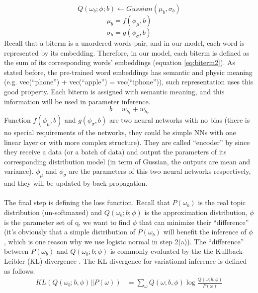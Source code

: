 \begin{equation}
    Q(\omega_b;\phi;b) \leftarrow Gussian(\mu_b,\sigma_b)
\label{eq:var1}
\end{equation}
\begin{equation}
    \mu_b = f(\phi_{\mu}, b)
\label{eq:var2}
\end{equation}
\begin{equation}
    \sigma_b = g(\phi_{\sigma}, b)
\label{eq:var3}
\end{equation}
Recall that a biterm is a unordered words pair, and in our model, each word is represented by its embedding. Therefore, in our model, each biterm is defined as the sum of its corresponding words' embeddings (equation \ref{eq:biterm2}). As stated before, the pre-trained word embeddings has semantic and physic meaning (e.g. vec(``phone'') + vec(``apple'') = vec(``iphone'')), such representation uses this good property. Each biterm is assigned with semantic meaning, and this information will be used in parameter inference.
\begin{equation}
    b = w_{b_1} + w_{b_2}
\label{eq:biterm2}
\end{equation}
Function $f(\phi_{\mu}, b)$ and $g(\phi_{\sigma}, b)$ are two neural networks with no bias (there is no special requirements of the networks, they could be simple NNs with one linear layer or with more complex structure). They are called ``encoder'' by \cite{kingma2013auto} since they receive a data (or a batch of data) and output the parameters of its corresponding distribution model (in term of Gussian, the outputs are mean and variance). $\phi_{\mu}$ and $\phi_{\sigma}$ are the parameters of this two neural networks respectively, and they will be updated by back propagation.\\\\
The final step is defining the loss function. Recall that $P(\omega_b)$ is the real topic distribution (un-softmaxed) and $Q(\omega_b;b;\phi)$ is the approximation distribution, $\phi$ is the parameter set of q, we want to find $\phi$ that can minimize their ``difference'' (it's obviously that a simple distribution of $P(\omega_b)$ will benefit the inference of $\phi$, which is one reason why we use logistc normal in step 2(a)). The ``difference'' between $P(\omega_b)$ and $Q(\omega_b;b;\phi)$ is commonly evaluated by the  the Kullback-Leibler (KL) divergence \cite{yang2017understanding}. The KL divergence for variational inference is defined as follows: 
\begin{equation}
    \begin{aligned}
        KL(Q(\omega_b;b,\phi)||P(\omega)) & = \sum_{\omega}Q(\omega;b,\phi)\log\frac{Q(\omega;b,\phi)}{P(\omega)}\\
    \end{aligned} 
    \label{eq:KL}
\end{equation}
